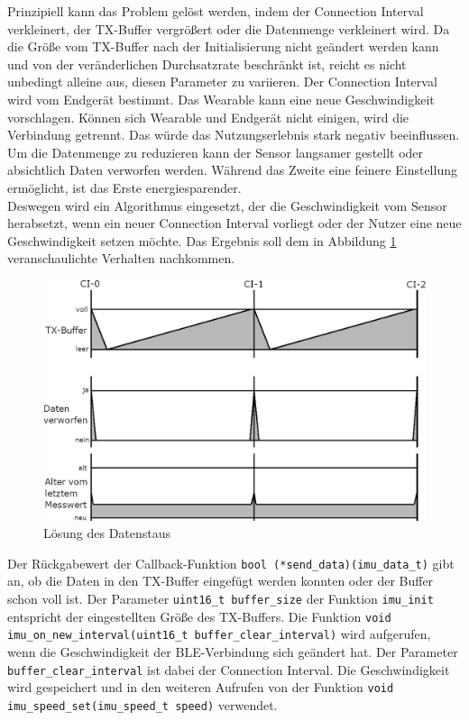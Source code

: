 Prinzipiell kann das Problem gelöst werden, indem der Connection Interval verkleinert, der TX-Buffer vergrößert oder die Datenmenge verkleinert wird.
Da die Größe vom TX-Buffer nach der Initialisierung nicht geändert werden kann und von der veränderlichen Durchsatzrate beschränkt ist, reicht es nicht unbedingt alleine aus, diesen Parameter zu variieren.
Der Connection Interval wird vom Endgerät bestimmt.
Das Wearable kann eine neue Geschwindigkeit vorschlagen.
Können sich Wearable und Endgerät nicht einigen, wird die Verbindung getrennt.
Das würde das Nutzungserlebnis stark negativ beeinflussen.
Um die Datenmenge zu reduzieren kann der Sensor langsamer gestellt oder absichtlich Daten verworfen werden.
Während das Zweite eine feinere Einstellung ermöglicht, ist das Erste energiesparender.\\
Deswegen wird ein Algorithmus eingesetzt, der die Geschwindigkeit vom Sensor herabsetzt, wenn ein neuer Connection Interval vorliegt oder der Nutzer eine neue Geschwindigkeit setzen möchte.
Das Ergebnis soll dem in Abbildung \ref{fig:daten_nachher} veranschaulichte Verhalten nachkommen.
\begin{figure}[!hbtp]
	\centering
	\includegraphics[width=0.76\linewidth]{res/datenNachher.jpg}
	\caption{Lösung des Datenstaus}
	\label{fig:daten_nachher}
\end{figure}
Der Rückgabewert der Callback-Funktion \texttt{bool (*send\_data)(imu\_data\_t)} gibt an, ob die Daten in den TX-Buffer eingefügt werden konnten oder der Buffer schon voll ist.
Der Parameter \texttt{uint16\_t buffer\_size} der Funktion \texttt{imu\_init} entspricht der eingestellten Größe des TX-Buffers.
Die Funktion \texttt{void imu\_on\_new\_interval(\allowbreak{}uint16\_t buffer\_clear\_interval)} wird aufgerufen, wenn die Geschwindigkeit der BLE-Verbindung sich geändert hat.
Der Parameter \texttt{buffer\_clear\_interval} ist dabei der Connection Interval.
Die Geschwindigkeit wird gespeichert und in den weiteren Aufrufen von der Funktion \texttt{void imu\_speed\_set(\allowbreak{}imu\_speed\_t speed)} verwendet.\\
